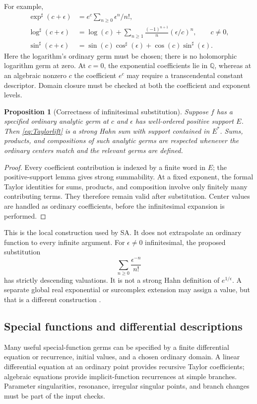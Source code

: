 \documentclass[11pt,letterpaper]{article}
\newtheorem{proposition}[theorem]{Proposition}
\theoremstyle{definition}\newtheorem{definition}[theorem]{Definition}
\theoremstyle{remark}\newtheorem{remark}[theorem]{Remark}
\newcommand{\Q}{\mathbb Q}\newcommand{\N}{\mathbb N}\newcommand{\Z}{\mathbb Z}
\numberwithin{equation}{section}\setcounter{tocdepth}{2}
\begin{document}
For example,
\begin{align}
 \exp^\sharp(c+\epsilon)&=e^c\sum_{n\ge0}\epsilon^n/n!,\label{eq:localexp}\\
 \log^\sharp(c+\epsilon)&=\log(c)+
 \sum_{n\ge1}\frac{(-1)^{n+1}}{n}(\epsilon/c)^n,
 \qquad c\ne0,\label{eq:locallog}\\
 \sin^\sharp(c+\epsilon)&=\sin(c)\cos^\sharp(\epsilon)
 +\cos(c)\sin^\sharp(\epsilon).\label{eq:localsin}
\end{align}
Here the logarithm's ordinary germ must be chosen; there is no holomorphic logarithm germ at zero. At $c=0$, the exponential coefficients lie in $\Q$, whereas at an algebraic nonzero $c$ the coefficient $e^c$ may require a transcendental constant descriptor. Domain closure must be checked at both the coefficient and exponent levels.

\begin{proposition}[Correctness of infinitesimal substitution]\label{prop:taylor}
Suppose $f$ has a specified ordinary analytic germ at $c$ and $\epsilon$ has well-ordered positive support $E$. Then \eqref{eq:Taylorlift} is a strong Hahn sum with support contained in $E^*$. Sums, products, and compositions of such analytic germs are respected whenever the ordinary centers match and the relevant germs are defined.
\end{proposition}
\begin{proof}
Every coefficient contribution is indexed by a finite word in $E$; the positive-support lemma gives strong summability. At a fixed exponent, the formal Taylor identities for sums, products, and composition involve only finitely many contributing terms. They therefore remain valid after substitution. Center values are handled as ordinary coefficients, before the infinitesimal expansion is performed.
\end{proof}
This is the local construction used by SA. It does not extrapolate an ordinary function to every infinite argument. For $\epsilon\ne0$ infinitesimal, the proposed substitution
\[
 \sum_{n\ge0}\frac{\epsilon^{-n}}{n!}
\]
has strictly descending valuations. It is not a strong Hahn definition of $e^{1/\epsilon}$. A separate global real exponential or surcomplex extension may assign a value, but that is a different construction \cite{SA}.

\subsection{Special functions and differential descriptions}
Many useful special-function germs can be specified by a finite differential equation or recurrence, initial values, and a chosen ordinary domain. A linear differential equation at an ordinary point provides recursive Taylor coefficients; algebraic equations provide implicit-function recurrences at simple branches. Parameter singularities, resonance, irregular singular points, and branch changes must be part of the input checks.
\end{document}
